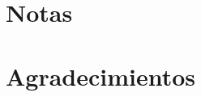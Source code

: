 \documentclass[12pt,twoside,openright,a5paper]{book}
\begin{document}


\cleardoublepage

\section*{Notas}



\cleardoublepage

\section*{Agradecimientos}




%

%
\end{document}
